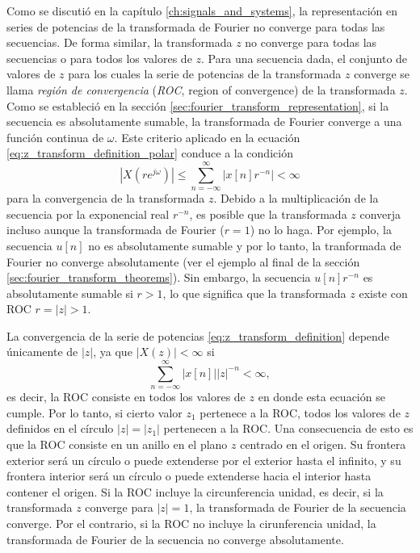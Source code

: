 \documentclass[a4paper]{report}
\begin{document}
Como se discutió en la capítulo \ref{ch:signals_and_systems}, la representación en series de potencias de la transformada de Fourier no converge para todas las secuencias. De forma similar, la transformada \(z\) no converge para todas las secuencias o para todos los valores de \(z\). Para una secuencia dada, el conjunto de valores de \(z\) para los cuales la serie de potencias de la transformada \(z\) converge se llama \emph{región de convergencia} (\emph{ROC}, region of convergence) de la transformada \(z\). Como se estableció en la sección \ref{sec:fourier_transform_representation}, si la secuencia es absolutamente sumable, la transformada de Fourier converge a una función continua de \(\omega\). Este criterio aplicado en la ecuación \ref{eq:z_transform_definition_polar} conduce a la condición
\[
 |X(re^{j\omega})|\leq\sum_{n=-\infty}^\infty|x[n]r^{-n}|<\infty 
\]
para la convergencia de la transformada \(z\). Debido a la multiplicación de la secuencia por la exponencial real \(r^{-n}\), es posible que la transformada \(z\) converja incluso aunque la transformada de Fourier (\(r=1\)) no lo haga. Por ejemplo, la secuencia \(u[n]\) no es absolutamente sumable y por lo tanto, la tranformada de Fourier no converge absolutamente (ver el ejemplo al final de la sección \ref{sec:fourier_transform_theorems}). Sin embargo, la secuencia \(u[n]r^{-n}\) es absolutamente sumable si \(r>1\), lo que significa que la transformada \(z\) existe con ROC \(r=|z|>1\).

La convergencia de la serie de potencias \ref{eq:z_transform_definition} depende únicamente de \(|z|\), ya que \(|X(z)|<\infty\) si
\[
 \sum_{n=-\infty}^\infty|x[n]||z|^{-n}<\infty,
\]
es decir, la ROC consiste en todos los valores de \(z\) en donde esta ecuación se cumple. Por lo tanto, si cierto valor \(z_1\) pertenece a la ROC, todos los valores de \(z\) definidos en el círculo \(|z|=|z_1|\) pertenecen a la ROC. Una consecuencia de esto es que la ROC consiste en un anillo en el plano \(z\) centrado en el origen. Su frontera exterior será un círculo o puede extenderse por el exterior hasta el infinito, y su frontera interior será un círculo o puede extenderse hacia el interior hasta contener el origen. Si la ROC incluye la circunferencia unidad, es decir, si la transformada \(z\) converge para \(|z|=1\), la transformada de Fourier de la secuencia converge. Por el contrario, si la ROC no incluye la cirunferencia unidad, la transformada de Fourier de la secuencia no converge absolutamente.
\end{document}
